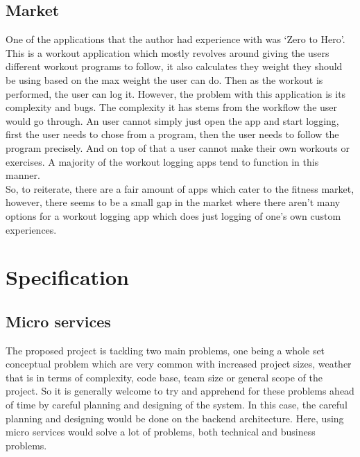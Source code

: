 \documentclass{article}
\newcommand{\vspaceconst}{-2ex}
\begin{document}
\begin{multicols}{2}
\subsection{Market}
\vspace{\vspaceconst}

One of the applications that the author had experience with was `Zero to Hero'\cite{zerotohero}. This is a workout application which mostly revolves around giving the users different workout programs to follow, it also calculates they weight they should be using based on the max weight the user can do. Then as the workout is performed, the user can log it. However, the problem with this application is its complexity and bugs. The complexity it has stems from the workflow the user would go through. An user cannot simply just open the app and start logging, first the user needs to chose from a program, then the user needs to follow the program precisely. And on top of that a user cannot make their own workouts or exercises. A majority of the workout logging apps tend to function in this manner.\\
So, to reiterate, there are a fair amount of apps which cater to the fitness market, however, there seems to be a small gap in the market where there aren't many options for a workout logging app which does just logging of one's own custom experiences.\\

\section{Specification}
\vspace{\vspaceconst}

\subsection{Micro services}
\vspace{\vspaceconst}

The proposed project is tackling two main problems, one being a whole set conceptual problem which are very common with increased project sizes, weather that is in terms of complexity, code base, team size or general scope of the project. So it is generally welcome to try and apprehend for these problems ahead of time by careful planning and designing of the system. In this case, the careful planning and designing would be done on the backend architecture. Here, using micro services would solve a lot of problems, both technical and business problems.\\


\end{multicols}
\end{document}
